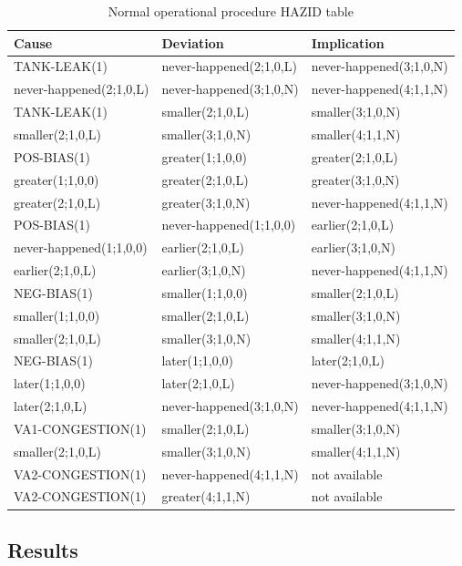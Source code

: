 \documentclass[conference]{IEEEtran}
\begin{document}
\begin{table}
\centering
\label{tab:normalophazid}
\begin{tabular}{|l|l|l|}
\hline
Cause & Deviation & Implication \\
\hline
TANK-LEAK(1) & never-happened(2;1,0,L) & never-happened(3;1,0,N) \\
never-happened(2;1,0,L) & never-happened(3;1,0,N) & never-happened(4;1,1,N) \\
TANK-LEAK(1) & smaller(2;1,0,L) & smaller(3;1,0,N) \\
smaller(2;1,0,L) & smaller(3;1,0,N) & smaller(4;1,1,N) \\
POS-BIAS(1) & greater(1;1,0,0) & greater(2;1,0,L) \\
greater(1;1,0,0) & greater(2;1,0,L) & greater(3;1,0,N) \\
greater(2;1,0,L) & greater(3;1,0,N) & never-happened(4;1,1,N) \\
POS-BIAS(1) & never-happened(1;1,0,0) & earlier(2;1,0,L) \\
never-happened(1;1,0,0) & earlier(2;1,0,L) & earlier(3;1,0,N) \\
earlier(2;1,0,L) & earlier(3;1,0,N) & never-happened(4;1,1,N) \\
NEG-BIAS(1) & smaller(1;1,0,0) & smaller(2;1,0,L) \\
smaller(1;1,0,0) & smaller(2;1,0,L) & smaller(3;1,0,N) \\
smaller(2;1,0,L) & smaller(3;1,0,N) & smaller(4;1,1,N) \\
NEG-BIAS(1) & later(1;1,0,0) & later(2;1,0,L) \\
later(1;1,0,0) & later(2;1,0,L) & never-happened(3;1,0,N) \\
later(2;1,0,L) & never-happened(3;1,0,N) & never-happened(4;1,1,N) \\
VA1-CONGESTION(1) & smaller(2;1,0,L) & smaller(3;1,0,N) \\
smaller(2;1,0,L) & smaller(3;1,0,N) & smaller(4;1,1,N) \\
VA2-CONGESTION(1) & never-happened(4;1,1,N) & not available \\
VA2-CONGESTION(1) & greater(4;1,1,N) & not available \\
\hline
\end{tabular}
\caption{Normal operational procedure HAZID table}
\end{table}

\subsection{Results}
\end{document}
